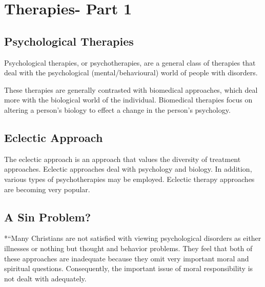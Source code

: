 \documentclass[
]{book}
\begin{document}
\hypertarget{therapies--part-1}{%
\section{Therapies- Part 1}\label{therapies--part-1}}

\hypertarget{psychological-therapies}{%
\subsection*{Psychological Therapies}\label{psychological-therapies}}

Psychological therapies, or psychotherapies, are a general class of therapies that deal with the psychological (mental/behavioural) world of people with disorders.

These therapies are generally contrasted with biomedical approaches, which deal more with the biological world of the individual. Biomedical therapies focus on altering a person's biology to effect a change in the person's psychology.

\hypertarget{eclectic-approach}{%
\subsection*{Eclectic Approach}\label{eclectic-approach}}

The eclectic approach is an approach that values the diversity of treatment approaches. Eclectic approaches deal with psychology and biology. In addition, various types of psychotherapies may be employed. Eclectic therapy approaches are becoming very popular.

\hypertarget{a-sin-problem}{%
\subsection*{A Sin Problem?}\label{a-sin-problem}}

*``Many Christians are not satisfied with viewing psychological disorders as either illnesses or nothing but thought and behavior problems. They feel that both of these approaches are inadequate because they omit very important moral and spiritual questions. Consequently, the important issue of moral responsibility is not dealt with adequately.
\end{document}
